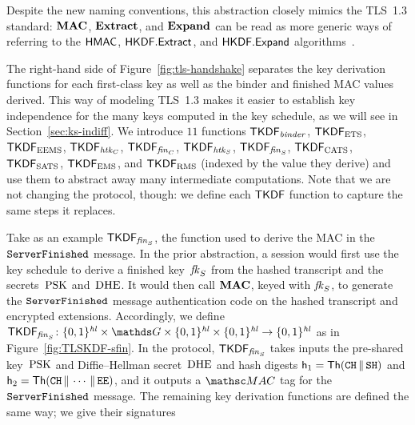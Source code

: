 Despite the new naming conventions, this abstraction closely mimics the TLS~1.3 standard:
$\mathbf{MAC}$, $\mathbf{Extract}$, and $\mathbf{Expand}$ can be read as more generic ways of referring to the $\mathsf{HMAC}$, $\mathsf{HKDF.Extract}$, and $\mathsf{HKDF.Expand}$ algorithms~\cite{rfc2104,rfc5869}. 



	

	

The right-hand side of Figure~\ref{fig:tls-handshake} separates the key derivation functions for each first-class key as well as the binder and finished MAC values derived.
This way of modeling TLS~1.3 makes it easier to establish key independence for the many keys computed in the key schedule, as we will see in Section~\ref{sec:ks-indiff}.
We introduce $11$ functions $\mathsf{TKDF}_{\mathit{binder}}$, $\mathsf{TKDF}_{\mathrm{ETS}}$, $\mathsf{TKDF}_{\mathrm{EEMS}}$, $\mathsf{TKDF}_{\mathit{htk}_C}$, $\mathsf{TKDF}_{\mathit{fin}_C}$, $\mathsf{TKDF}_{\mathit{htk}_S}$, $\mathsf{TKDF}_{\mathit{fin}_S}$, $\mathsf{TKDF}_{\mathrm{CATS}}$, $\mathsf{TKDF}_{\mathrm{SATS}}$, $\mathsf{TKDF}_{\mathrm{EMS}}$, and $\mathsf{TKDF}_{\mathrm{RMS}}$ (indexed by the value they derive) and use them to abstract away many intermediate computations.
Note that we are not changing the protocol, though:
we define each $\mathsf{TKDF}$ function to capture the same steps it replaces.

Take as an example $\mathsf{TKDF}_{\mathit{fin}_S}$, the function used to derive the MAC in the $\mathtt{ServerFinished}$ message.
In the prior abstraction, a session would first use the key schedule to derive a finished key~$\mathit{fk}_S$ from the hashed transcript and the secrets~$\mathrm{PSK}$ and~$\mathrm{DHE}$. 
It would then call $\mathbf{MAC}$, keyed with $\mathit{fk}_S$, to generate the $\mathtt{ServerFinished}$ message authentication code on the hashed transcript and encrypted extensions.
Accordingly, we define $\TLSKDF_{\sfin} \colon \bits^{\hashlen} \times \G \times \bits^{\hashlen}\times \bits^{\hashlen} \to \bits^{\hashlen}$ as in Figure~\ref{fig:TLSKDF-sfin}.
In the protocol, $\mathsf{TKDF}_{\mathit{fin}_S}$ takes inputs the pre-shared key~$\mathrm{PSK}$ and Diffie--Hellman secret~$\mathrm{DHE}$ and hash digests $\mathsf{h}_1 = \mathsf{Th}(\mathtt{CH} {\,\|\,} \mathtt{SH})$ and $\mathsf{h}_2 = \mathsf{Th}(\mathtt{CH} {\,\|\,} \dotsb {\,\|\,} \mathtt{EE})$, and it outputs a $\MAC$ tag for the $\mathtt{ServerFinished}$ message.
%
The remaining key derivation functions are defined the same way; we give their signatures 
 
